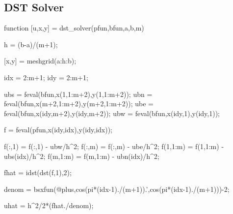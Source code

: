 \documentclass[12pt,a4paper]{article}
\begin{document}
\subsection{DST Solver}
\begingroup\makeatletter{}
\verbatim

%
%
%

function [u,x,y] = dst_solver(pfun,bfun,a,b,m)

h = (b-a)/(m+1);   %

[x,y] = meshgrid(a:h:b);   %

idx = 2:m+1;
idy = 2:m+1;

ubs = feval(bfun,x(1,1:m+2),y(1,1:m+2));     %
ubn = feval(bfun,x(m+2,1:m+2),y(m+2,1:m+2)); %
ube = feval(bfun,x(idy,m+2),y(idy,m+2));     %
ubw = feval(bfun,x(idy,1),y(idy,1));         %

f = feval(pfun,x(idy,idx),y(idy,idx));

f(:,1) = f(:,1) - ubw/h^2;             %
f(:,m) = f(:,m) - ube/h^2;             %
f(1,1:m) = f(1,1:m) - ubs(idx)/h^2;    %
f(m,1:m) = f(m,1:m) - ubn(idx)/h^2;    %

fhat = idst(dst(f,1),2);

denom = bsxfun(@plus,cos(pi*(idx-1)./(m+1)).',cos(pi*(idx-1)./(m+1)))-2;

uhat = h^2/2*(fhat./denom);
\end{document}
